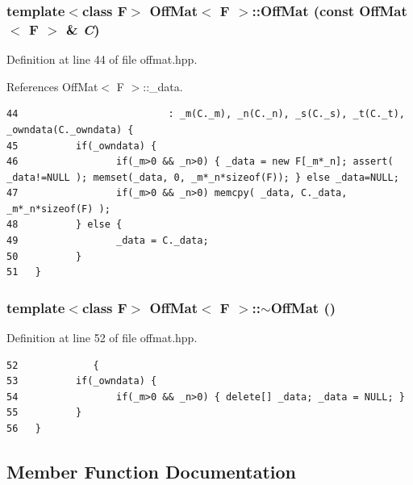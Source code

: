 \subsubsection{\setlength{\rightskip}{0pt plus 5cm}template$<$class F$>$ {\bf Off\-Mat}$<$ F $>$::{\bf Off\-Mat} (const {\bf Off\-Mat}$<$ F $>$ \& {\em C})\hspace{0.3cm}{\tt  [inline]}}\label{classOffMat_e389b62b2f5bfa80c53f09bd1b220e8b_e389b62b2f5bfa80c53f09bd1b220e8b}




Definition at line 44 of file offmat.hpp.

References Off\-Mat$<$ F $>$::\_\-data.

\footnotesize\begin{verbatim}44                          : _m(C._m), _n(C._n), _s(C._s), _t(C._t), _owndata(C._owndata) {
45          if(_owndata) {
46                 if(_m>0 && _n>0) { _data = new F[_m*_n]; assert( _data!=NULL ); memset(_data, 0, _m*_n*sizeof(F)); } else _data=NULL;
47                 if(_m>0 && _n>0) memcpy( _data, C._data, _m*_n*sizeof(F) );
48          } else {
49                 _data = C._data;
50          }
51   }
\end{verbatim}\normalsize 


\subsubsection{\setlength{\rightskip}{0pt plus 5cm}template$<$class F$>$ {\bf Off\-Mat}$<$ F $>$::$\sim${\bf Off\-Mat} ()\hspace{0.3cm}{\tt  [inline]}}\label{classOffMat_6b175c3f417acb2dd0bf16fb2fc1386a_6b175c3f417acb2dd0bf16fb2fc1386a}




Definition at line 52 of file offmat.hpp.

\footnotesize\begin{verbatim}52             { 
53          if(_owndata) { 
54                 if(_m>0 && _n>0) { delete[] _data; _data = NULL; } 
55          }
56   }
\end{verbatim}\normalsize 




\subsection{Member Function Documentation}

